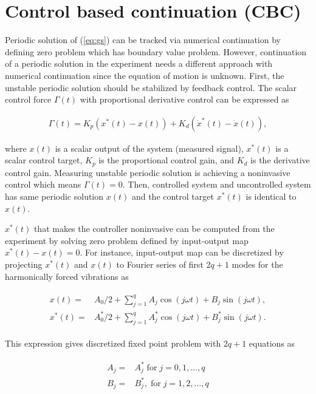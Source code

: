 \documentclass[openacc]{rsproca_new}%
\newcommand{\Eref}[1]{(\ref{#1})}
\begin{document}
\section{Control based continuation (CBC)}\label{CBC}

Periodic solution of \Eref{eq:gs} can be tracked via numerical continuation by defining zero problem which has boundary value problem. However, continuation of a periodic solution in the experiment needs a different approach with numerical continuation since the equation of motion is unknown. First, the unstable periodic solution should be stabilized by feedback control. The scalar control force $\Gamma(t)$ with proportional derivative control can be expressed as

\begin{align}
  \Gamma(t)=K_p(x^*(t)-x(t))+K_d(\dot x^*(t)-\dot x(t)),
\end{align}

\noindent where $x(t)$ is a scalar output of the system (measured signal), $x^*(t)$ is a scalar control target, $K_p$ is the proportional control gain, and $K_d$ is the derivative control gain. Measuring unstable periodic solution is achieving a noninvasive control which means $\Gamma(t)=0$. Then, controlled system and uncontrolled system has same periodic solution $x(t)$ and the control target $x^*(t)$ is identical to $x(t)$.

$x^*(t)$ that makes the controller noninvasive can be computed from the experiment by solving zero problem defined by input-output map $x^*(t)-x(t)=0$. For instance, input-output map can be discretized by projecting $x^*(t)$ and $x(t)$ to Fourier series of first $2q+1$ modes for the harmonically forced vibrations as

\begin{align}\label{eq:dis}
  \begin{split}
  x(t)=&A_0/2+  \sum_{j=1}^{q} A_j \cos (j\omega t)+B_j \sin (j\omega t),\\
  x^*(t)=&A_0^*/2+  \sum_{j=1}^{q} A^*_j \cos (j\omega t)+B^*_j \sin (j\omega t).
\end{split}
\end{align}

\noindent This expression gives discretized fixed point problem with $2q+1$ equations as

\begin{align}\label{eq:zp}
  \begin{split}
  A_j=&A^*_j \; \textrm{for} \; j=0,1,\ldots,q\\
  B_j=&B^*_j,\; \textrm{for} \; j=1,2,\ldots,q
\end{split}
\end{align}
\end{document}

